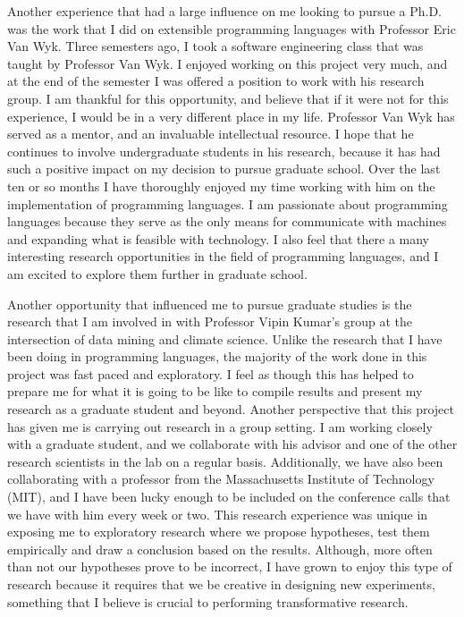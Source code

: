 \documentclass[a4paper,12pt]{article}
\begin{document}
Another experience that had a large influence on me looking to pursue a Ph.D. was the work that I did on extensible programming languages with Professor Eric Van Wyk. Three semesters ago, I took a software engineering class that was taught by Professor Van Wyk. I enjoyed working on this project very much, and at the end of the semester I was offered a position to work with his research group. I am thankful for this opportunity, and believe that if it were not for this experience, I would be in a very different place in my life. Professor Van Wyk has served as a mentor, and an invaluable intellectual resource. I hope that he continues to involve undergraduate students in his research, because it has had such a positive impact on my decision to pursue graduate school. Over the last ten or so months I have thoroughly enjoyed my time working with him on the implementation of programming languages. I am passionate about programming languages because they serve as the only means for communicate with machines and expanding what is feasible with technology.  I also feel that there a many interesting research opportunities in the field of programming languages, and I am excited to explore them further in graduate school.

Another opportunity that influenced me to pursue graduate studies is the research that I am involved in with Professor Vipin Kumar's group at the intersection of data mining and climate science.  Unlike the research that I have been doing in programming languages, the majority of the work done in this project was fast paced and exploratory.  I feel as though this has helped to prepare me for what it is going to be like to compile results and present my research as a graduate student and beyond.  Another perspective that this project has given me is carrying out research in a group setting. I am working closely with a graduate student, and we collaborate with his advisor and one of the other research scientists in the lab on a regular basis. Additionally, we have also been collaborating with a professor from the Massachusetts Institute of Technology (MIT), and I have been lucky enough to be included on the conference calls that we have with him every week or two. This research experience was unique in exposing me to exploratory research where we propose hypotheses, test them empirically and draw a conclusion based on the results. Although, more often than not our hypotheses prove to be incorrect, I have grown to enjoy this type of research because it requires that we be creative in designing new experiments, something that I believe is crucial to performing transformative research.
\end{document}
